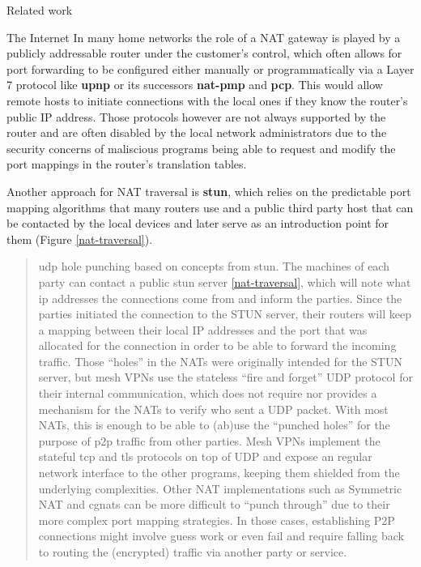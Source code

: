 \begin{frame}[fragile]{Related work}
\begin{block}{The Internet}
In many home networks the role of a NAT gateway is played by a publicly
addressable router under the customer's control, which often allows for
port forwarding to be configured either manually or programmatically via
a Layer 7 protocol like \textbf{\gls{upnp}} or its successors
\textbf{\gls{nat-pmp}} and \textbf{\gls{pcp}}. This would allow remote
hosts to initiate connections with the local ones if they know the
router's public IP address. Those protocols however are not always
supported by the router and are often disabled by the local network
administrators due to the security concerns of maliscious programs being
able to request and modify the port mappings in the router's translation
tables.

Another approach for NAT traversal is \textbf{\gls{stun}}, which relies
on the predictable port mapping algorithms that many routers use and a
public third party host that can be contacted by the local devices and
later serve as an introduction point for them (Figure
\ref{nat-traversal}).


\begin{quote}
\gls{udp} hole punching based on concepts from \gls{stun}. The machines
of each party can contact a public \gls{stun} server
\ref{nat-traversal}, which will note what \gls{ip} addresses the
connections come from and inform the parties. Since the parties
initiated the connection to the STUN server, their routers will keep a
mapping between their local IP addresses and the port that was allocated
for the connection in order to be able to forward the incoming traffic.
Those ``holes'' in the NATs were originally intended for the STUN
server, but mesh VPNs use the stateless ``fire and forget'' UDP protocol
for their internal communication, which does not require nor provides a
mechanism for the NATs to verify who sent a UDP packet. With most NATs,
this is enough to be able to (ab)use the ``punched holes'' for the
purpose of \gls{p2p} traffic from other parties. Mesh VPNs implement the
stateful \gls{tcp} and \gls{tls} protocols on top of UDP and expose an
regular network interface to the other programs, keeping them shielded
from the underlying complexities. Other NAT implementations such as
Symmetric NAT and \glspl{cgnat} can be more difficult to ``punch
through'' due to their more complex port mapping strategies. In those
cases, establishing P2P connections might involve guess work or even
fail and require falling back to routing the (encrypted) traffic via
another party or service.
\end{quote}


\end{block}
\end{frame}
